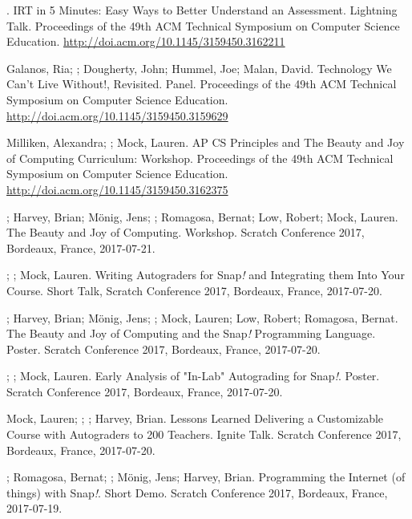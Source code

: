 \begin{etaremune}
    \item{\me. IRT in 5 Minutes: Easy Ways to Better Understand an Assessment. Lightning Talk. Proceedings of the 49th ACM Technical Symposium on Computer Science Education.} \href{http://doi.acm.org/10.1145/3159450.3162211}{http://doi.acm.org/10.1145/3159450.3162211}

    \item{Galanos, Ria; \me; Dougherty, John; Hummel, Joe; Malan, David. Technology We Can't Live Without!, Revisited. Panel. Proceedings of the 49th ACM Technical Symposium on Computer Science Education.} \href{http://doi.acm.org/10.1145/3159450.3159629}{http://doi.acm.org/10.1145/3159450.3159629}

    \item{Milliken, Alexandra; \me; Mock, Lauren. AP CS Principles and The Beauty and Joy of Computing Curriculum: Workshop. Proceedings of the 49th ACM Technical Symposium on Computer Science Education.} \href{http://doi.acm.org/10.1145/3159450.3162375}{http://doi.acm.org/10.1145/3159450.3162375}

    
    \item{\dan; Harvey, Brian; Mönig, Jens; \me; Romagosa, Bernat; Low, Robert; Mock, Lauren. The Beauty and Joy of Computing. Workshop. Scratch Conference 2017, Bordeaux, France, 2017-07-21.}

    \item{\me; \dan; Mock, Lauren. Writing Autograders for Snap\textit{!} and Integrating them Into Your Course. Short Talk, Scratch Conference 2017, Bordeaux, France, 2017-07-20.}

    \item{\dan; Harvey, Brian; Mönig, Jens; \me; Mock, Lauren; Low, Robert; Romagosa, Bernat. The Beauty and Joy of Computing and the Snap\textit{!} Programming Language. Poster. Scratch Conference 2017, Bordeaux, France, 2017-07-20.}

    \item{\me; \dan; Mock, Lauren. Early Analysis of "In-Lab" Autograding for Snap\textit{!}. Poster. Scratch Conference 2017, Bordeaux, France, 2017-07-20.}

    \item{Mock, Lauren; \me; \dan; Harvey, Brian. Lessons Learned Delivering a Customizable Course with Autograders to 200 Teachers. Ignite Talk. Scratch Conference 2017, Bordeaux, France, 2017-07-20.}
    
    \item{\dan; Romagosa, Bernat; \me; Mönig, Jens; Harvey, Brian. Programming the Internet (of things) with Snap\textit{!}. Short Demo. Scratch Conference 2017, Bordeaux, France, 2017-07-19.}


\end{etaremune}
